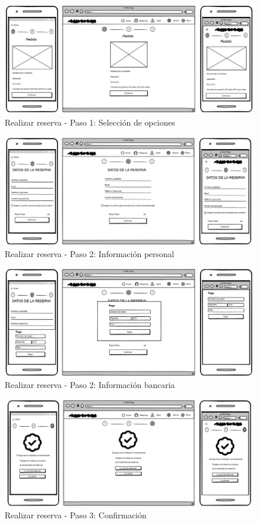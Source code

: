 \begin{figure}[H]
	\centering
	\includegraphics[width=0.8\linewidth]{5-AnalisisDelSistemaDeInformacion/InterfacesDeUsuario/Reservar/reservar-paso1.png}
	\caption{Realizar reserva - Paso 1: Selección de opciones}
	\label{fig:paso1}
\end{figure}

\begin{figure}[H]
	\centering
	\includegraphics[width=0.8\linewidth]{5-AnalisisDelSistemaDeInformacion/InterfacesDeUsuario/Reservar/reservar-paso2-personales.png}
	\caption{Realizar reserva - Paso 2: Información personal}
	\label{fig:paso2-personales}
\end{figure}

\begin{figure}[H]
	\centering
	\includegraphics[width=0.8\linewidth]{5-AnalisisDelSistemaDeInformacion/InterfacesDeUsuario/Reservar/reservar-paso2-bancarios.png}
	\caption{Realizar reserva - Paso 2: Información bancaria}
	\label{fig:paso2-bancarios}
\end{figure}

\begin{figure}[H]
	\centering
	\includegraphics[width=0.8\linewidth]{5-AnalisisDelSistemaDeInformacion/InterfacesDeUsuario/Reservar/reservar-paso3.png}
	\caption{Realizar reserva - Paso 3: Confirmación}
	\label{fig:paso3}
\end{figure}
